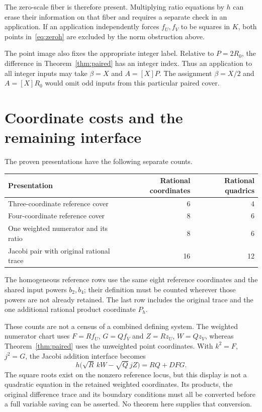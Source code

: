 \documentclass[11pt,a4paper]{article}
\begin{document}
The zero-scale fiber is therefore present. Multiplying ratio equations
by $h$ can erase their information on that fiber and requires a separate
check in an application. If an application independently forces
$f_U,f_V$ to be squares in $K$, both points in~\eqref{eq:zeroh}
are excluded by the norm obstruction above.

The point image also fixes the appropriate integer label. Relative to
$P=2R_0$, the difference in Theorem~\ref{thm:paired} has an integer
index. Thus an application to all integer inputs may take
$\beta=X$ and $A=[X]P$. The assignment $\beta=X/2$ and
$A=[X]R_0$ would omit odd inputs from this particular paired cover.

\section{Coordinate costs and the remaining interface}
The proven presentations have the following separate counts.
\begin{center}
\begin{tabular}{lrr}
\toprule
Presentation & Rational coordinates & Rational quadrics\\
\midrule
Three-coordinate reference cover &6&4\\
Four-coordinate reference cover &8&6\\
One weighted numerator and its ratio &8&6\\
Jacobi pair with original rational trace &16&12\\
\bottomrule
\end{tabular}
\end{center}
The homogeneous reference rows use the same eight reference
coordinates and the shared input powers $b_2,b_4$; their definition
must be counted wherever those powers are not already retained.
The last row includes the original trace and the one additional
rational product coordinate $P_h$.

These counts are not a census of a combined defining system.
The weighted numerator chart uses $F=Rf_U$, $G=Qf_V$ and
$Z=Rz_U$, $W=Qz_V$, whereas Theorem~\ref{thm:paired} uses
the unweighted point coordinates. With $k^2=F$, $j^2=G$, the
Jacobi addition interface becomes
\[
 h\bigl(\sqrt R\,kW-\sqrt Q\,jZ\bigr)=RQ+DFG.
\]
The square roots exist on the nonzero reference locus, but this
display is not a quadratic equation in the retained weighted
coordinates. Its products, the original difference trace and its
boundary conditions must all be converted before a full variable
saving can be asserted. No theorem here supplies that conversion.
\end{document}

